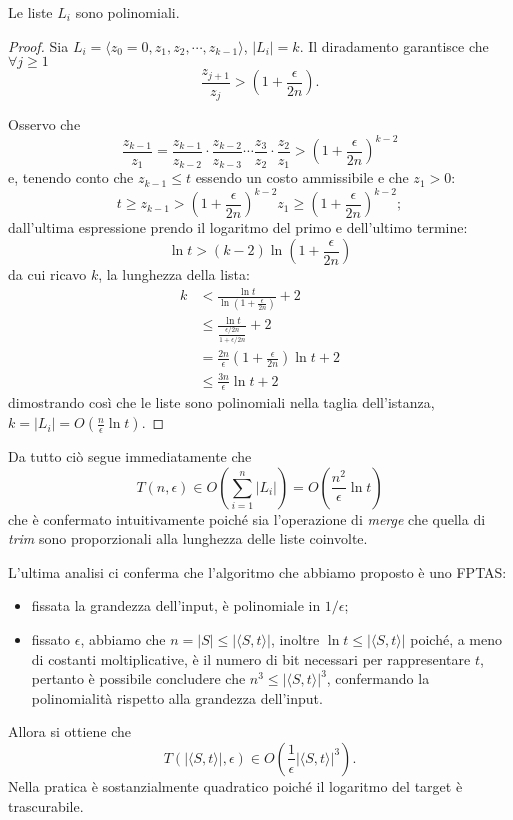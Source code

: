 \begin{proposizione}
Le liste $L_i$ sono polinomiali.
\end{proposizione}
\begin{proof}
Sia $L_i= \langle z_0=0, z_1, z_2, \cdots , z_{k-1} \rangle$, $|L_i|=k$. Il diradamento garantisce che $\forall j \geq 1$
\[
\frac{z_{j+1}}{z_j} > \left(1+\frac{\epsilon}{2n}\right).
\]

Osservo che
\[
\frac{z_{k-1}}{z_1} = \frac{z_{k-1}}{z_{k-2}}\cdot\frac{z_{k-2}}{z_{k-3}}\cdots\frac{z_3}{z_2}\cdot\frac{z_2}{z_1} > \left(1+\frac{\epsilon}{2n}\right)^{k-2}
\]
e, tenendo conto che $z_{k-1} \leq t$ essendo un costo ammissibile e che $z_1>0$:
\[
t \geq z_{k-1} > \left(1+\frac{\epsilon}{2n}\right)^{k-2}z_1 \geq \left(1+\frac{\epsilon}{2n}\right)^{k-2};
\]
dall'ultima espressione prendo il logaritmo del primo e dell'ultimo termine:
\[
\ln{t} > (k-2)\ln{\left(1+\frac{\epsilon}{2n}\right)}
\]
da cui ricavo $k$, la lunghezza della lista:
\[
\begin{split}
k &< \frac{\ln{t}}{\ln{\left(1+\frac{\epsilon}{2n}\right)}} + 2 \\
&\leq \frac{\ln{t}}{\frac{\epsilon/2n}{1+\epsilon/2n}} +2 \\
&= \frac{2n}{\epsilon}\left(1+\frac{\epsilon}{2n}\right)\ln{t}+2 \\
&\leq \frac{3n}{\epsilon}\ln{t}+2
\end{split}
\]
dimostrando così che le liste sono polinomiali nella taglia dell'istanza, $k=|L_i|=O\left(\frac{n}{\epsilon}\ln{t}\right)$.
\end{proof}

Da tutto ciò segue immediatamente che
\[
T(n,\epsilon)\in O\left(\sum_{i=1}^n |L_i|\right)=O\left(\frac{n^2}{\epsilon}\ln{t}\right)
\]
che è confermato intuitivamente poiché sia l'operazione di \textit{merge} che quella di \textit{trim} sono proporzionali alla lunghezza delle liste coinvolte.

L'ultima analisi ci conferma che l'algoritmo che abbiamo proposto è uno FPTAS:
\begin{itemize}
\item fissata la grandezza dell'input, è polinomiale in $1/\epsilon$;
\item fissato $\epsilon$, abbiamo che $n=|S|\leq|\langle S,t\rangle|$, inoltre $\ln{t}\leq|\langle S,t\rangle|$ poiché, a meno di costanti moltiplicative, è il numero di bit necessari per rappresentare $t$, pertanto è possibile concludere che $n^3\leq|\langle S,t\rangle|^3$, confermando la polinomialità rispetto alla grandezza dell'input.
\end{itemize}
Allora si ottiene che
\[
T(|\langle S,t \rangle|,\epsilon)\in O\left(\frac{1}{\epsilon}|\langle S,t \rangle|^3\right).
\]
Nella pratica è sostanzialmente quadratico poiché il logaritmo del target è trascurabile.
